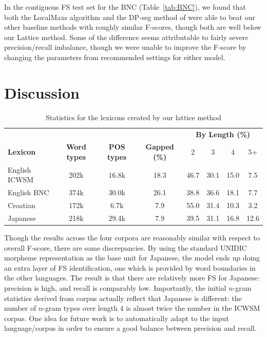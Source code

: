 \documentclass[11pt,letterpaper]{article}
\newcommand{\tabref}[2][]{Table#1~\ref{#2}\xspace}
\begin{document}
In the contiguous FS test set for the BNC (\tabref{tab:BNC}), we found that both the LocalMaxs algorithm and the DP-seg method of  were able to beat our other baseline methods with roughly similar F-scores, though both are well below our Lattice method. Some of the difference seems attributable to fairly severe precision/recall imbalance, though we were unable to improve the F-score by changing the parameters from recommended settings for either model.


\section{Discussion} \label{sec:discussion}


\begin{table}[!bt]
 
 \begin{center}
 \begin{tabular}{lccccccc}
\toprule
& & & & \multicolumn{4}{c}{\bf{By Length (\%) }} \\
       \cmidrule(lr){5-8}	
\bf{Lexicon} & \bf{Word types} & \bf{POS types} & \bf{Gapped} (\%) & 2 & 3 & 4 & 5+ \\ 
\midrule
English ICWSM & 202k & 16.8k & 18.3 & 46.7 & 30.1 & 15.0 & 7.5  \\
English BNC & 374k &  30.0k& 26.1& 38.8 & 36.6 & 18.1 & 7.7 \\
Croatian & 172k & 6.7k & 7.9& 55.0& 31.4 & 10.3 & 3.2 \\
Japanese & 218k &  29.4k &7.9& 39.5 & 31.1& 16.8 & 12.6 \\
\bottomrule
\end{tabular}
  \caption{Statistics for the lexicons created by our lattice method}
	 \label{tab:lexstats}

 \end{center}


 \end{table}


Though the results across the four corpora are reasonably similar with respect to overall F-score, there are some discrepancies. By using the standard UNIDIC morpheme representation as the base unit for Japanese, the model ends up doing an extra layer of FS identification, one which is provided by word boundaries in the other languages. The result is that there are relatively more FS for Japanese: precision is high, and recall is comparably low.  Importantly, the initial $n$-gram statistics derived from corpus actually reflect that Japanese is different: the number of $n$-gram types over length 4 is almost twice the number in the ICWSM corpus. One idea for future work is to automatically adapt to the input language/corpus in order to ensure a good balance between precision and recall.
\end{document}
